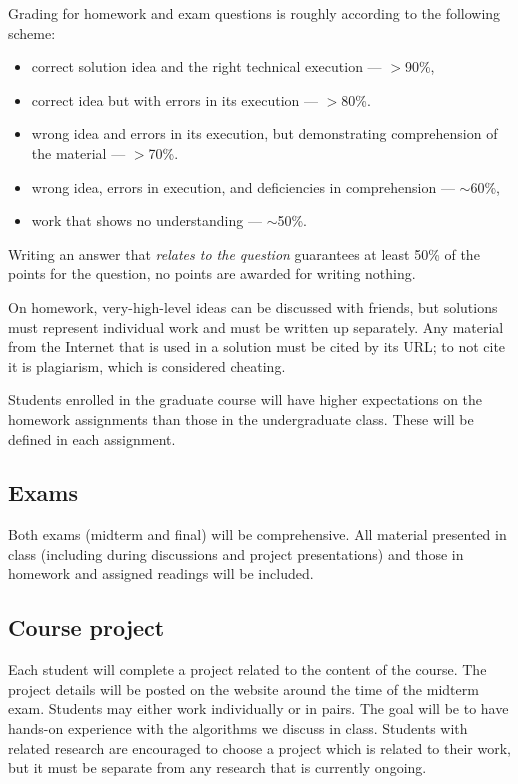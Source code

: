 \documentclass[12pt]{scrartcl}
\begin{document}
Grading for homework and exam questions is roughly according to the following scheme:
\begin{itemize}
\item correct solution idea and the right technical execution --- $>$90\%, 
\item correct idea but with errors in its execution --- $>$80\%. 
\item wrong idea and errors in its execution, but demonstrating comprehension of the material --- $>$70\%. 
\item wrong idea, errors in execution, and deficiencies in comprehension --- $\sim$60\%, 
\item  work that shows no understanding --- $\sim$50\%.
\end{itemize}
Writing an answer that \emph{relates to the question} guarantees at least 50\% of the points for the question, 
no points are awarded for writing nothing.

On homework, very-high-level ideas can be discussed with friends, but solutions must represent individual work and must be written up separately. 
Any material from the Internet that is used in a solution must be cited by its URL; to not cite it is plagiarism, which is considered cheating.

Students enrolled in the graduate course will have higher expectations on the homework assignments than those in the undergraduate class. 
These will be defined in each assignment. 

\subsection{Exams}

Both exams (midterm and final) will be comprehensive. 
All material presented in class (including during discussions and project presentations) 
and those in homework and assigned readings will be included.

\subsection{Course project}
Each student will complete a project related to the content of the course. 
The project details will be posted on the website around the time of the midterm exam. 
Students may either work individually or in pairs. 
The goal will be to have hands-on experience with the algorithms we discuss in class. 
Students with related research are encouraged to choose a project which is related to their work, but it must be separate from any research that is currently ongoing.
\end{document}
